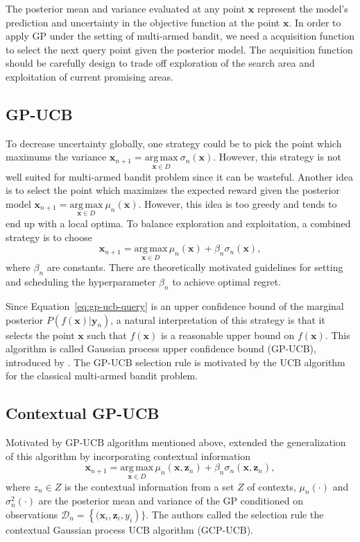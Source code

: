 \documentclass{article}
\begin{document}
The posterior mean and variance evaluated at any point $\mathbf{x}$
represent the model's prediction and uncertainty in the objective
function at the point $\mathbf{x}$. In order to apply GP under the
setting of multi-armed bandit, we need a acquisition function to select
the next query point given the posterior model. The acquisition
function should be carefully design to trade off exploration of the
search area and exploitation of current promising areas.

\subsection{GP-UCB}
To decrease uncertainty globally, one strategy could be to pick the
point which maximums the variance $\mathbf{x}_{n+1}=
\underset{\mathbf{x} \in
  D}{\mathrm{arg\,max}}~\sigma_n(\mathbf{x})$. However, this strategy
is not well suited for multi-armed bandit problem since it can be
wasteful. Another idea is to
select the point which maximizes the expected reward given the
posterior model $\mathbf{x}_{n+1}=
\underset{\mathbf{x} \in
  D}{\mathrm{arg\,max}}~\mu_n(\mathbf{x})$. However, this idea is too
greedy and tends to end up with a local optima. To balance exploration
and exploitation, a combined strategy is to choose
\begin{equation}
  \mathbf{x}_{n+1} = \underset{\mathbf{x} \in D}{\mathrm{arg \,
      max}}\,\mu_n(\mathbf{x})+\beta_n \sigma_n(\mathbf{x}),
\end{equation} \label{eq:gp-ucb-query}
where $\beta_n$ are constants. There are theoretically motivated
guidelines for setting and scheduling the hyperparameter $\beta_n$ to
achieve optimal regret.

Since Equation~\ref{eq:gp-ucb-query} is an upper confidence bound of
the marginal posterior $P(f(\mathbf{x})|\mathbf{y}_n)$, a natural
interpretation of this strategy is that it selects the point
$\mathbf{x}$ such that $f(\mathbf{x})$ is a reasonable upper bound on
$f(\mathbf{x})$. This algorithm is called Gaussian process upper
confidence bound (GP-UCB), introduced by \cite{Srinivas2010-hi}. The
GP-UCB selection rule is motivated by the UCB algorithm for the
classical multi-armed bandit problem.

\subsection{Contextual GP-UCB}
Motivated by GP-UCB algorithm mentioned above, \cite{Krause2011-sb}
extended the generalization of this algorithm by incorporating
contextual information
\begin{equation}
  \mathbf{x}_{n+1} = \underset{\mathbf{x} \in D}{\mathrm{arg \,
      max}}\,\mu_n(\mathbf{x}, \mathbf{z}_n)+\beta_n
  \sigma_n(\mathbf{x}, \mathbf{z}_n),
\end{equation} \label{eq:cgp-ucb-query}
where $z_n \in Z$ is the contextual information from a set $Z$ of
contexts, $\mu_n(\cdot)$ and $\sigma_n^2(\cdot)$ are the posterior mean
and variance of the GP conditioned on observations $\mathcal{D}_n =
\left \{( \mathbf{x}_i, \mathbf{z}_i, y_i \right )\}.$ The authors
called the selection rule the contextual Gaussian process UCB
algorithm (GCP-UCB).
\end{document}
